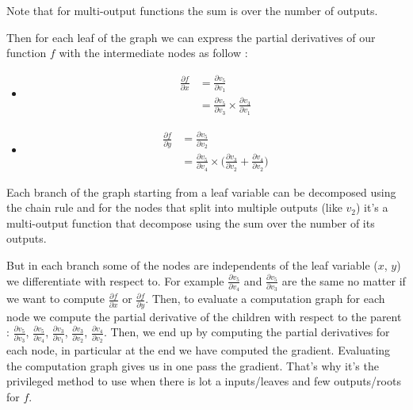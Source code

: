 \documentclass[12pt]{article}
\begin{document}
Note that for multi-output functions the sum is over the number of outputs.

\bigskip

Then for each leaf of the graph we can express the partial derivatives of our function $f$ with the intermediate nodes as follow :

\begin{itemize}
    \item
\begin{equation*}
\begin{split}
\frac{\partial{f}}{\partial{x}} &= \frac{\partial{v_5}}{\partial{v_1}} \\
&= \frac{\partial{v_5}}{\partial{v_3}} \times \frac{\partial{v_3}}{\partial{v_1}}
\end{split}
\end{equation*}

    \item
\begin{equation*}
\begin{split}
\frac{\partial{f}}{\partial{y}} &= \frac{\partial{v_5}}{\partial{v_2}} \\
&= \frac{\partial{v_5}}{\partial{v_4}} \times \big( \frac{\partial{v_3}}{\partial{v_2}} + \frac{\partial{v_4}}{\partial{v_2}} \big)
\end{split}
\end{equation*}

\end{itemize}


Each branch of the graph starting from a leaf variable can be decomposed using the chain rule and for the nodes that split into multiple outputs (like $v_2$) it's a multi-output function that decompose using the sum over the number of its outputs.

\begin{figure}[H]
 \centering
 
\end{figure}


But in each branch some of the nodes are independents of the leaf variable ($x$, $y$) we differentiate with respect to. For example $\frac{\partial{v_5}}{\partial{v_4}}$ and $\frac{\partial{v_5}}{\partial{v_3}}$ are the same no matter if we want to compute $\frac{\partial{f}}{\partial{x}}$ or $\frac{\partial{f}}{\partial{y}}$. Then, to evaluate a computation graph for each node we compute the partial derivative of the children with respect to the parent : $\frac{\partial{v_5}}{\partial{v_3}}$, $\frac{\partial{v_5}}{\partial{v_4}}$, $\frac{\partial{v_3}}{\partial{v_1}}$, $\frac{\partial{v_3}}{\partial{v_2}}$, $\frac{\partial{v_4}}{\partial{v_2}}$. 
\newline
Then, we end up by computing the partial derivatives for each node, in particular at the end we have computed the gradient. Evaluating the computation graph gives us in one pass the gradient. That's why it's the privileged method to use when there is lot a inputs/leaves and few outputs/roots for $f$.
\end{document}
